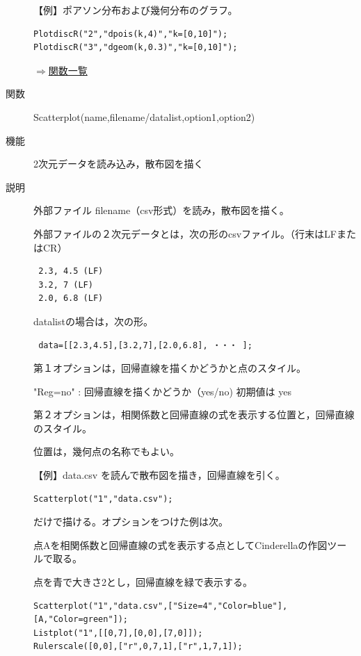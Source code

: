 \documentclass[papersize,a4paper,12pt,uplatex]{jsarticle}
\begin{document}
\begin{description}
【例】ポアソン分布および幾何分布のグラフ。
\begin{verbatim}
PlotdiscR("2","dpois(k,4)","k=[0,10]");
PlotdiscR("3","dgeom(k,0.3)","k=[0,10]");
\end{verbatim}
\begin{flushright}\hyperlink{functionlist}{$\Rightarrow$関数一覧}\end{flushright}

\vspace{\baselineskip}
\hypertarget{scatterplot}{}
\item[関数]Scatterplot(name,filename/datalist,option1,option2)
\item[機能]2次元データを読み込み，散布図を描く
\item[説明]外部ファイル filename（csv形式）を読み，散布図を描く。

外部ファイルの２次元データとは，次の形のcsvファイル。（行末はLFまたはCR）
\begin{verbatim}
 2.3, 4.5 (LF)
 3.2, 7 (LF)
 2.0, 6.8 (LF)
\end{verbatim}


datalistの場合は，次の形。

\begin{verbatim}
 data=[[2.3,4.5],[3.2,7],[2.0,6.8], ・・・ ];
\end{verbatim}


第１オプションは，回帰直線を描くかどうかと点のスタイル。

"Reg=no" : 回帰直線を描くかどうか（yes/no) 初期値は yes

第２オプションは，相関係数と回帰直線の式を表示する位置と，回帰直線のスタイル。

位置は，幾何点の名称でもよい。

\vspace{\baselineskip}
【例】data.csv を読んで散布図を描き，回帰直線を引く。
\begin{verbatim}
Scatterplot("1","data.csv");
\end{verbatim}

だけで描ける。オプションをつけた例は次。

点Aを相関係数と回帰直線の式を表示する点としてCinderellaの作図ツールで取る。

点を青で大きさ2とし，回帰直線を緑で表示する。

\begin{verbatim}
Scatterplot("1","data.csv",["Size=4","Color=blue"],[A,"Color=green"]);
Listplot("1",[[0,7],[0,0],[7,0]]);
Rulerscale([0,0],["r",0,7,1],["r",1,7,1]);
\end{verbatim}
 
\vspace{\baselineskip}
 \begin{center}  \end{center}

\end{description}
\end{document}
